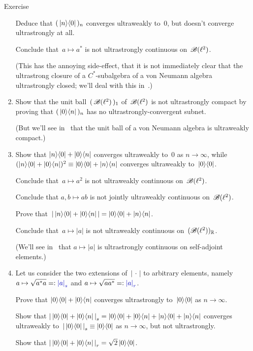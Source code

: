 \documentclass[a]{subfiles}
\begin{document}
\begin{parsec}
\begin{point}{Exercise}
\begin{enumerate}
Deduce that $(\,\left|n\right>\!\left<0\right|\,)_n$ converges ultraweakly to~$0$,
but doesn't converge ultrastrongly at all.

Conclude that~$a\mapsto a^*$ is not ultrastrongly continuous 
on~$\mathscr{B}(\ell^2)$.

(This has the annoying side-effect,
that it is not immediately clear that the ultrastrong
closure of a $C^*$-subalgebra of a von Neumann algebra
ultrastrongly closed; we'll deal with this in~.)
\item
Show that the unit ball~$(\,\mathscr{B}(\ell^2)\,)_1$
of~$\mathscr{B}(\ell^2)$ is not ultrastrongly compact
by proving that $(\,\left|0\right>\!\left<n\right|\,)_n$
has no ultrastrongly-convergent subnet.

(But we'll see in~ that
the unit ball of a von Neumann algebra
is ultraweakly compact.)

\item
Show that $\left|n\right>\!\left<0\right|+\left|0\right>\!\left<n\right|$
converges ultraweakly to~$0$ as $n\to \infty$,
while $(\left|n\right>\!\left<0\right|+\left|0\right>\!\left<n\right|)^2\equiv \left|0\right>\!\left<0\right|+\left|n\right>\!\left<n\right|$
converges ultraweakly to~$\left|0\right>\!\left<0\right|$.

Conclude that~$a\mapsto a^2$ is not ultraweakly continuous on~$\mathscr{B}(\ell^2)$.

Conclude that $a,b\mapsto ab$ is not jointly ultraweakly continuous
on~$\mathscr{B}(\ell^2)$.

Prove that~$\left|\, \left|n\right>\!\left<0\right|+\left|0\right>\!\left<n\right|\,\right|
= \left|0\right>\!\left<0\right|+\left|n\right>\!\left<n\right|$.

Conclude that~$a\mapsto \left|a\right|$
is not ultraweakly continuous on~$(\mathscr{B}(\ell^2))_{\mathbb{R}}$.

(We'll see in~ that $a\mapsto \left|a\right|$
is ultrastrongly continuous on self-adjoint elements.)

\item
Let us consider the two extensions of~$\left|\,\cdot\,\right|$
to arbitrary elements, namely
$a\mapsto \sqrt{a^*a}=:\Define{\left|a\right|_s}$ and 
$a\mapsto \sqrt{aa^*}=:\Define{\left|a\right|_r}$.

Prove that $\left|0\right>\!\left<0\right| + \left|0\right>\!\left<n\right|$
converges ultrastrongly to~$\left|0\right>\!\left<0\right|$ as $n\to \infty$.

Show that $\left|\,\left|0\right>\!\left<0\right|+\left|0\right>\!\left<n\right|\,\right|_s
= \left|0\right>\!\left<0\right|
+\left|0\right>\!\left<n\right|
+\left|n\right>\!\left<0\right|
+\left|n\right>\!\left<n\right|$
converges ultraweakly to~$\left|\,\left|0\right>\!\left<0\right|\,\right|_s
\equiv \left|0\right>\!\left<0\right|$
as $n\to \infty$,
but not ultrastrongly.

Show that $\left|\,\left|0\right>\!\left<0\right|+\left|0\right>\!\left<n\right|\,\right|_r
= \sqrt{2} \left|0\right>\!\left<0\right|$.


\end{enumerate}
\end{point}
\end{parsec}
\end{document}
